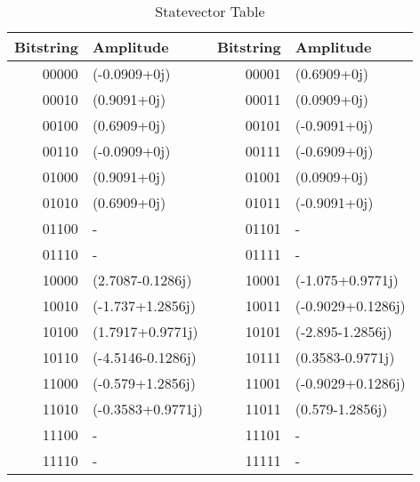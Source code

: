 \begin{table}[H]
\centering
\caption{Statevector Table}
\label{tab:sv_for_LODF}
\begin{tabular}{@{}rlrl@{}}
\toprule
Bitstring & {Amplitude} & Bitstring & {Amplitude} \\
\midrule
00000 & (-0.0909+0j) & 00001 & (0.6909+0j) \\
00010 & (0.9091+0j) & 00011 & (0.0909+0j) \\
00100 & (0.6909+0j) & 00101 & (-0.9091+0j) \\
00110 & (-0.0909+0j) & 00111 & (-0.6909+0j) \\
01000 & (0.9091+0j) & 01001 & (0.0909+0j) \\
01010 & (0.6909+0j) & 01011 & (-0.9091+0j) \\
01100 & {-} & 01101 & {-} \\
01110 & {-} & 01111 & {-} \\
10000 & (2.7087-0.1286j) & 10001 & (-1.075+0.9771j) \\
10010 & (-1.737+1.2856j) & 10011 & (-0.9029+0.1286j) \\
10100 & (1.7917+0.9771j) & 10101 & (-2.895-1.2856j) \\
10110 & (-4.5146-0.1286j) & 10111 & (0.3583-0.9771j) \\
11000 & (-0.579+1.2856j) & 11001 & (-0.9029+0.1286j) \\
11010 & (-0.3583+0.9771j) & 11011 & (0.579-1.2856j) \\
11100 & {-} & 11101 & {-} \\
11110 & {-} & 11111 & {-} \\
\bottomrule
\end{tabular}\end{table}